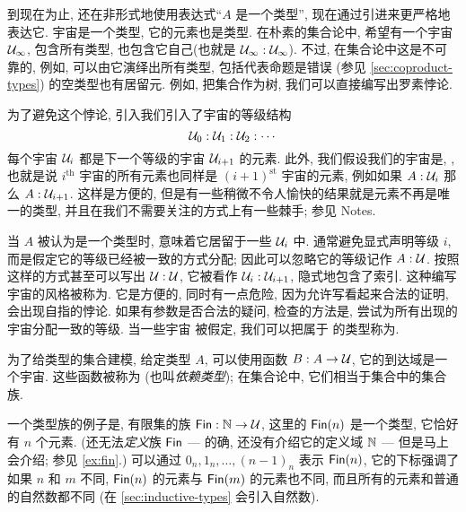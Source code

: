 到现在为止, 还在非形式地使用表达式``$A$ 是一个类型'', 现在通过引进来更严格地表达它.
%
%
宇宙是一个类型, 它的元素也是类型.
在朴素的集合论中, 希望有一个宇宙 $\mathcal{U}_\infty$, 包含所有类型, 也包含它自己(也就是 $\mathcal{U}_\infty : \mathcal{U}_\infty$).
不过, 在集合论中这是不可靠的, 例如, 可以由它演绎出所有类型, 包括代表命题是错误 (参见 \cref{sec:coproduct-types}) 的空类型也有居留元.
例如, 把集合作为树, 我们可以直接编写出罗素悖论\cite{coquand:paradox}.

为了避免这个悖论, 引入我们引入了宇宙的等级结构
\[ \mathcal{U}_0 : \mathcal{U}_1 : \mathcal{U}_2 : \cdots \]
每个宇宙 $\mathcal{U}_i$ 都是下一个等级的宇宙 $\mathcal{U}_{i+1}$ 的元素.
此外, 我们假设我们的宇宙是,  , 也就是说 $i^{\mathrm{th}}$ 宇宙的所有元素也同样是 $(i+1)^{\mathrm{st}}$ 宇宙的元素, 例如如果 $A:\mathcal{U}_i$ 那么 $A:\mathcal{U}_{i+1}$.
这样是方便的, 但是有一些稍微不令人愉快的结果就是元素不再是唯一的类型, 并且在我们不需要关注的方式上有一些棘手;
参见 Notes.

当 $A$ 被认为是一个类型时, 意味着它居留于一些 $\mathcal{U}_i$ 中.
通常避免显式声明等级
%
%
%
$i$, 而是假定它的等级已经被一致的方式分配;
因此可以忽略它的等级记作 $A:\mathcal{U}$.
按照这样的方式甚至可以写出 $\mathcal{U}:\mathcal{U}$, 它被看作 $\mathcal{U}_i:\mathcal{U}_{i+1}$, 隐式地包含了索引.
这种编写宇宙的风格被称为.
它是方便的, 同时有一点危险, 因为允许写看起来合法的证明, 会出现自指的悖论.
如果有参数是否合法的疑问, 检查的方法是, 尝试为所有出现的宇宙分配一致的等级.
当一些宇宙 \UU 被假定, 我们可以把属于 \UU 的类型称为.
%
%


为了给类型的集合建模, 给定类型 $A$, 可以使用函数 $B : A \to \mathcal{U}$, 它的到达域是一个宇宙.
这些函数被称为
%
(也叫\emph{依赖类型});
%
%
%
%
在集合论中, 它们相当于集合中的集合族.


一个类型族的例子是, 有限集的族 $\mathsf{Fin} : \mathbb{N} \to \mathcal{U}$, 这里的 $\mathsf{Fin}(n)$ 是一个类型, 它恰好有 $n$ 个元素.
(还无法\emph{定义}族 $\mathsf{Fin}$ --- 的确, 还没有介绍它的定义域 $\mathbb{N}$ --- 但是马上会介绍; 参见 \cref{ex:fin}.)
可以通过 $0_n,1_n,\dots,(n-1)_n$ 表示 $\mathsf{Fin}(n)$, 它的下标强调了如果 $n$ 和 $m$ 不同,  $\mathsf{Fin}(n)$ 的元素与 $\mathsf{Fin}(m)$ 的元素也不同, 而且所有的元素和普通的自然数都不同 (在 \cref{sec:inductive-types} 会引入自然数).
%


